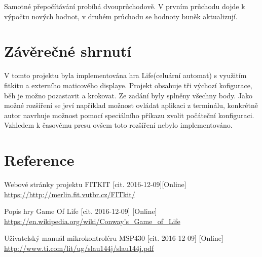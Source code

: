 \documentclass[12pt,a4paper,titlepage]{article}
\begin{document}
Samotné přepočítávání probíhá dvouprůchodově. V prvním průchodu dojde k výpočtu nových hodnot, v druhém průchodu se hodnoty buněk aktualizují. 

\section{Závěrečné shrnutí}
V tomto projektu byla implementována hra Life(celuární automat) s využitím fitkitu a externího maticového displaye. Projekt obsahuje tři výchozí kofigurace, běh je možno pozastavit a krokovat. Ze zadání byly splněny všechny body. Jako možné rozšíření se jeví například možnost ovládat aplikaci z terminálu, konkrétně autor navrhuje možnost pomocí speciálního příkazu zvolit počáteční konfiguraci. Vzhledem k časovému presu ovšem toto rozšíření nebylo implementováno.

\section*{Reference}
\begin{enumerate}[label={[\arabic*]}]
\item Webové stránky projektu FITKIT [cit. 2016-12-09][Online] \\
     \href{https://http://merlin.fit.vutbr.cz/FITkit/}
          {https://http://merlin.fit.vutbr.cz/FITkit/}
     \label{fitkit}
\item Popis hry Game Of Life [cit. 2016-12-09] [Online] \\
    \href{https://en.wikipedia.org/wiki/Conway's\_Game\_of\_Life}
         {https://en.wikipedia.org/wiki/Conway's\_Game\_of\_Life}
    \label{game-of-life}
\item Uživatelský manuál mikrokontroléru MSP430 [cit. 2016-12-09] [Online] \\
    \href{http://www.ti.com/lit/ug/slau144j/slau144j.pdf}
         {http://www.ti.com/lit/ug/slau144j/slau144j.pdf}
    \label{msp430}
\end{enumerate}
\end{document}
